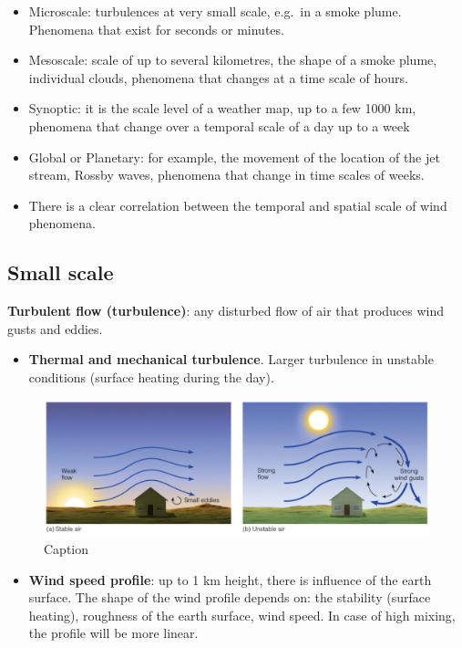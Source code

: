 \documentclass[oneside]{book}
\providecommand{\tightlist}{%
  \setlength{\itemsep}{0pt}\setlength{\parskip}{0pt}}
\begin{document}
\begin{itemize}
\tightlist
\item
  Microscale: turbulences at very small scale, e.g.~in a smoke plume.
  Phenomena that exist for seconds or minutes.\\
\item
  Mesoscale: scale of up to several kilometres, the shape of a smoke
  plume, individual clouds, phenomena that changes at a time scale of
  hours.
\item
  Synoptic: it is the scale level of a weather map, up to a few 1000 km,
  phenomena that change over a temporal scale of a day up to a week\\
\item
  Global or Planetary: for example, the movement of the location of the
  jet stream, Rossby waves, phenomena that change in time scales of
  weeks.
\item
  There is a clear correlation between the temporal and spatial scale of
  wind phenomena.
\end{itemize}

\subsection{Small scale}\label{small-scale}

\textbf{Turbulent flow (turbulence)}: any disturbed flow of air that
produces wind gusts and eddies.

\begin{itemize}
\tightlist
\item
  \textbf{Thermal and mechanical turbulence}. Larger turbulence in
  unstable conditions (surface heating during the day).
\end{itemize}

\begin{figure}

{\centering \includegraphics[width=0.4\linewidth]{figures/Figure418} 

}

\caption{Caption}\label{fig:Thermal}
\end{figure}

\begin{itemize}
\tightlist
\item
  \textbf{Wind speed profile}: up to 1 km height, there is influence of
  the earth surface. The shape of the wind profile depends on: the
  stability (surface heating), roughness of the earth surface, wind
  speed. In case of high mixing, the profile will be more linear.
\end{itemize}
\end{document}
